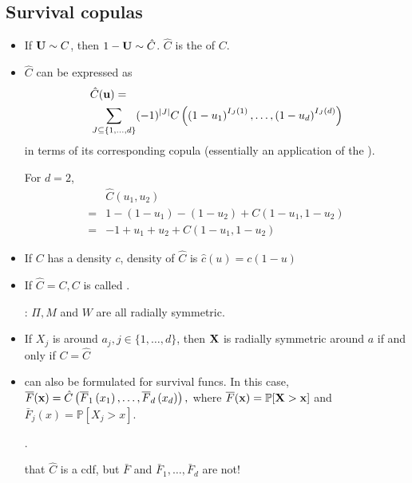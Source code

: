 \subsection*{Survival copulas}
\begin{itemize}[leftmargin=*]
    \item If $\operatorname{\boldsymbol{\mathbf{U}}} \sim C$, then $1-\operatorname{\boldsymbol{\mathbf{U}}} \sim \hat{C}$. $\hat{C}$ is the  of $C$.
    \item $\hat{C}$ can be expressed as
$$
\begin{aligned}
&\hat{C}(\operatorname{\boldsymbol{\mathbf{u}}})= \\
&\sum_{J \subseteq\{1, \ldots, d\}}(-1)^{|J|} C\left(\left(1-u_{1}\right)^{I_{J}(1)}, \ldots,\left(1-u_{d}\right)^{I_{J}(d)}\right)
\end{aligned}
$$
in terms of its corresponding copula
(essentially an application of the ).

For $d=2$,
$$
\begin{aligned}
&\hat{C}\left(u_{1}, u_{2}\right) \\ =& 1-\left(1-u_{1}\right)-\left(1-u_{2}\right)+C\left(1-u_{1}, 1-u_{2}\right) \\
=& -1+u_{1}+u_{2}+C\left(1-u_{1}, 1-u_{2}\right)
\end{aligned}
$$
    \item If $C$ has a density $c$, density of $\hat{C}$ is $\hat{c}(u)=c(1-u)$
    \item If $\hat{C}=C, C$ is called . 
    
    : $\Pi, M$ and $W$ are all radially symmetric.
    \item If $X_{j}$ is  around $a_{j}, j \in\{1, \ldots, d\}$, then $\operatorname{\boldsymbol{\mathbf{X}}}$ is radially symmetric around $a$ if and only if $C=\hat{C}$
    \item {} can also be formulated for survival funcs. In this case,
$
\overline{F}(\operatorname{\boldsymbol{\mathbf{x}}})=\hat{C}\left(\overline{F}_{1}\left(x_{1}\right), \ldots, \overline{F}_{d}\left(x_{d}\right)\right),
$ where $\overline{F}(\operatorname{\boldsymbol{\mathbf{x}}})=\mathbb{P}[\operatorname{\boldsymbol{\mathbf{X}}}>\operatorname{\boldsymbol{\mathbf{x}}}]$ and $\bar{F}_{j}(x)=\mathbb{P}\left[X_{j}>x\right]$. 

.

 that $\hat{C}$ is a cdf, but $\bar{F}$ and $\bar{F}_{1}, \ldots, \bar{F}_{d}$ are not!
\end{itemize}










